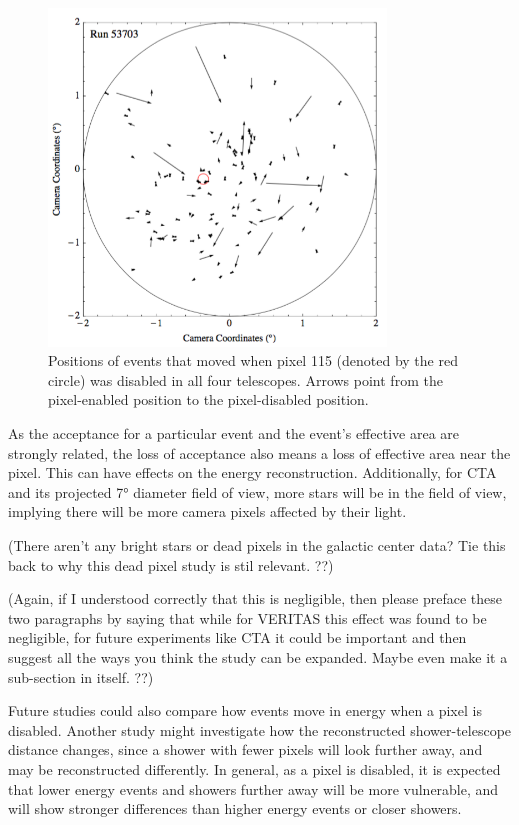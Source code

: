     \begin{figure}[ht]
      \centering
      \includegraphics[width=0.8\textwidth]{images/disabled_pixel/moving_events}
      \caption[Event Movement]{
        Positions of events that moved when pixel 115 (denoted by the red circle) was disabled in all four telescopes.  
        Arrows point from the pixel-enabled position to the pixel-disabled position.
      }
      \label{fig:dpix_move}
    \end{figure}

    As the acceptance for a particular event and the event's effective area are strongly related, the loss of acceptance also means a loss of effective area near the pixel.
    This can have effects on the energy reconstruction.
    Additionally, for CTA and its projected \ang{7} diameter field of view, more stars will be in the field of view, implying there will be more camera pixels affected by their light.
    
    {\color{red}(There aren't any bright stars or dead pixels in the galactic center data? Tie this back to why this dead pixel study is stil relevant. ??)}
    
    {\color{red}(Again, if I understood correctly that this is negligible, then please preface these two paragraphs by saying that while for VERITAS this effect was found to be negligible, for future experiments like CTA it could be important and then suggest all the ways you think the study can be expanded. Maybe even make it a sub-section in itself. ??)}

    Future studies could also compare how events move in energy when a pixel is disabled.
    Another study might investigate how the reconstructed shower-telescope distance changes, since a shower with fewer pixels will look further away, and may be reconstructed differently.
    In general, as a pixel is disabled, it is expected that lower energy events and showers further away will be more vulnerable, and will show stronger differences than higher energy events or closer showers.


